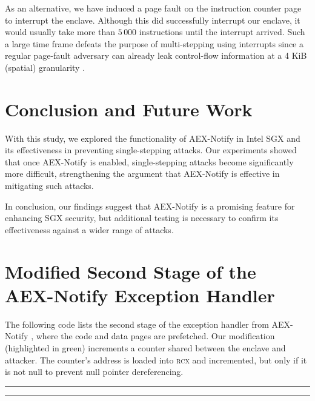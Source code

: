 \documentclass{llncs}
\begin{document}
As an alternative, we have induced a page fault on the instruction counter page
to interrupt the enclave.
Although this did successfully interrupt our enclave, it would usually take
more than $5\,000$ instructions until the interrupt arrived.
Such a large time frame defeats the purpose of multi-stepping using interrupts
since a regular page-fault adversary can already leak control-flow information
at a 4 KiB (spatial) granularity \cite{XuCP15}.

\section{Conclusion and Future Work}

With this study, we explored the functionality of AEX-Notify in Intel SGX and
its effectiveness in preventing single-stepping attacks.
Our experiments showed that once AEX-Notify is enabled, single-stepping attacks
become significantly more difficult, strengthening the argument that AEX-Notify
is effective in mitigating such attacks.

In conclusion, our findings suggest that AEX-Notify is a promising feature for
enhancing SGX security, but additional testing is necessary to confirm its
effectiveness against a wider range of attacks.


%


\clearpage
\appendix

\section{Modified Second Stage of the AEX-Notify Exception Handler}
\label{apx:modification}

The following code lists the second stage of the exception handler from
AEX-Notify \cite{ConstableBCXXAK23}, where the code and data pages are
prefetched.
Our modification (highlighted in green) increments a counter shared between the
enclave and attacker.
The counter's address is loaded into \textsc{rcx} and incremented, but only if
it is not null to prevent null pointer dereferencing.

\noindent
\rule{0.8\textwidth}{0.4pt}
\vspace{-0.5em}
%
\vspace{-1.1em}
%
\vspace{-1.1em}

\vspace{-1em}
\rule{0.8\textwidth}{0.4pt}
\end{document}
